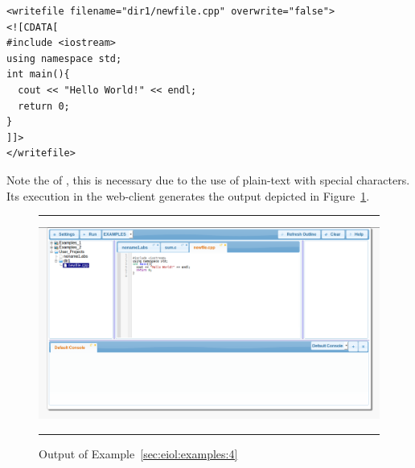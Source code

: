 \begin{example}
\begin{example}
\medskip
\begin{lstlisting}
<writefile filename="dir1/newfile.cpp" overwrite="false">
<![CDATA[
#include <iostream>
using namespace std;
int main(){
  cout << "Hello World!" << endl;
  return 0;
}
]]>
</writefile>
\end{lstlisting}

\medskip
\noindent
Note the of \lst{<![CDATA[ ... ]]>}, this is necessary due to the use
of plain-text with special characters. Its execution in the web-client
generates the output depicted in Figure~\ref{fig:examples:4}.

\begin{figure}[h]
\hrule\smallskip
\begin{center}
\includegraphics[width=1\textwidth]{fig/example4.png}
\end{center}
\caption{Output of Example~\ref{sec:eiol:examples:4}}
\label{fig:examples:4}
\hrule
\end{figure}
\end{example}

\end{example}

